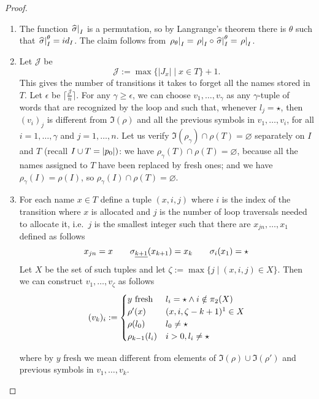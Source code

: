 \begin{proof}\hfill
\begin{enumerate}


\item The function $\left.\widehat{\sigma}\right|_{I}$ is a permutation, so by Langrange's theorem there is $\theta$ such that $\left.\widehat{\sigma}\right|_{I}^\theta = id_I$. The claim follows from $\left. \rho_\theta \right|_{ I } =\left. \rho \right|_{I} \circ \left. \widehat{\sigma}\right|_{I}^{\theta} = \left. \rho \right|_{I}$.


\item
Let $\mathcal{J}$ be
\[
	\mathcal{J} := \max \{ |J_x|\mid x \in T \} + 1 .
\]
This gives the number of transitions it takes to forget all the names stored in $T$. Let $\epsilon$ be $\lceil \frac{\mathcal{J}}{n} \rceil$. For any $\gamma \geq \epsilon$, we can choose $v_1,\dots,v_\gamma$ as any $\gamma$-tuple of words that are recognized by the loop and such that, whenever $l_j = \star$, then $(v_i)_j$ is different from $\Im(\rho)$ and all the previous symbols in $v_1,\dots,v_i$, for all $i=1,\dots,\gamma$ and $j=1,\dots,n$. Let us verify $\Im(\rho_\gamma) \cap \rho(T) = \varnothing$ separately on $I$ and $T$ (recall $I \cup T = |p_0|)$: we have $\rho_\gamma(T) \cap \rho(T) = \varnothing$, because all the names assigned to $T$ have been replaced by fresh ones; and we have $\rho_\gamma(I) = \rho(I)$, so $\rho_\gamma(I) \cap \rho(T) = \varnothing$.

\item For each name $x \in T$ define a tuple $(x,i,j)$ where $i$ is the index of the transition where $x$ is allocated and $j$ is the number of loop traversals needed to allocate it, i.e.\ $j$ is the smallest integer such that there are $x_{jn},\dots,x_1$ defined as follows
\[
	x_{jn} = x \qquad \sigma_{\underline{k+1}}(x_{k+1}) = x_k \qquad \sigma_i(x_1) = \star
\]
Let $X$ be the set of such tuples and let $\zeta := \max \{ j \mid (x,i,j) \in X \}$. Then we can construct $v_1,\dots,v_\zeta$ as follows
\[
	(v_k)_i :=
	\begin{cases}
		\text{$y$ fresh} & l_i = \star \land i \notin \pi_2(X) \\
		\rho'(x) & (x,i,\zeta - k + 1)\footnotemark \in X
		 \\
		\rho(l_0) & l_0 \neq \star \\
		\rho_{k-1}(l_i) & i > 0 , l_i \neq \star
	\end{cases}
\]

where by $y$ fresh we mean different from elements of $\Im(\rho) \cup \Im(\rho')$ and previous symbols in $v_1,\dots,v_{k}$.


\end{enumerate}
\end{proof}
